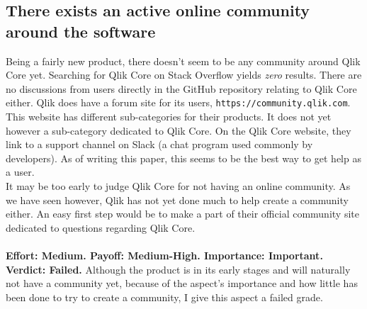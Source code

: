 \documentclass{cslthse-msc}
\begin{document}
    \subsection{There exists an active online community around the software}
    Being a fairly new product, there doesn't seem to be any community around Qlik Core yet. Searching for Qlik Core on Stack Overflow yields \textit{zero} results. There are no discussions from users directly in the GitHub repository relating to Qlik Core either. Qlik does have a forum site for its users, \texttt{https://community.qlik.com}. This website has different sub-categories for their products. It does not yet however a sub-category dedicated to Qlik Core. On the Qlik Core website, they link to a support channel on Slack (a chat program used commonly by developers). As of writing this paper, this seems to be the best way to get help as a user.\\
    It may be too early to judge Qlik Core for not having an online community. As we have seen however, Qlik has not yet done much to help create a community either. An easy first step would be to make a part of their official community site dedicated to questions regarding Qlik Core.\\ \\
    \textbf{Effort: Medium. Payoff: Medium-High. Importance: Important.}\\
    \textbf{Verdict: Failed.} Although the product is in its early stages and will naturally not have a community yet, because of the aspect's importance and how little has been done to try to create a community, I give this aspect a failed grade.
\end{document}
